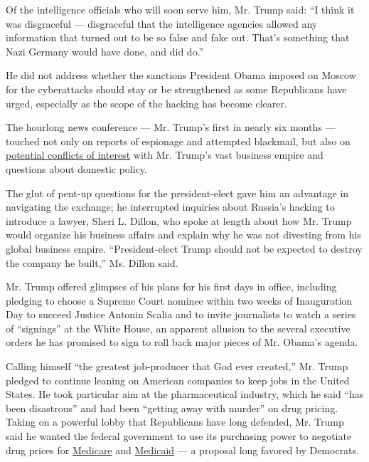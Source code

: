 Of the intelligence officials who will soon serve him, Mr. Trump said:
``I think it was disgraceful --- disgraceful that the intelligence
agencies allowed any information that turned out to be so false and fake
out. That's something that Nazi Germany would have done, and did do.''

He did not address whether the sanctions President Obama imposed on
Moscow for the cyberattacks should stay or be strengthened as some
Republicans have urged, especially as the scope of the hacking has
become clearer.

The hourlong news conference --- Mr. Trump's first in nearly six months
--- touched not only on reports of espionage and attempted blackmail,
but also on
\href{https://www.nytimes.com/2017/01/11/us/politics/trump-organization-business-conflicts.html?hp\&action=click\&pgtype=Homepage\&clickSource=story-heading\&module=a-lede-package-region\&region=top-news\&WT.nav=top-news}{potential
conflicts of interest} with Mr. Trump's vast business empire and
questions about domestic policy.

The glut of pent-up questions for the president-elect gave him an
advantage in navigating the exchange; he interrupted inquiries about
Russia's hacking to introduce a lawyer, Sheri L. Dillon, who spoke at
length about how Mr. Trump would organize his business affairs and
explain why he was not divesting from his global business empire.
``President-elect Trump should not be expected to destroy the company he
built,'' Ms. Dillon said.

Mr. Trump offered glimpses of his plans for his first days in office,
including pledging to choose a Supreme Court nominee within two weeks of
Inauguration Day to succeed Justice Antonin Scalia and to invite
journalists to watch a series of ``signings'' at the White House, an
apparent allusion to the several executive orders he has promised to
sign to roll back major pieces of Mr. Obama's agenda.

Calling himself ``the greatest job-producer that God ever created,'' Mr.
Trump pledged to continue leaning on American companies to keep jobs in
the United States. He took particular aim at the pharmaceutical
industry, which he said ``has been disastrous'' and had been ``getting
away with murder'' on drug pricing. Taking on a powerful lobby that
Republicans have long defended, Mr. Trump said he wanted the federal
government to use its purchasing power to negotiate drug prices for
\href{http://topics.nytimes.com/top/news/health/diseasesconditionsandhealthtopics/medicare/index.html?inline=nyt-classifier}{Medicare}
and
\href{http://topics.nytimes.com/top/news/health/diseasesconditionsandhealthtopics/medicaid/index.html?inline=nyt-classifier}{Medicaid}
--- a proposal long favored by Democrats.

